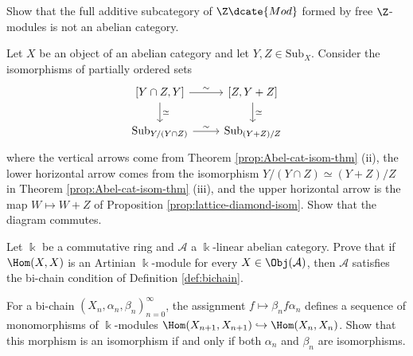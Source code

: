 \begin{Exercises}
	\item Show that the full additive subcategory of $\Z\dcate{Mod}$ formed by
	free $\Z$-modules is not an abelian category.

	\item Let $X$ be an object of an abelian category and let
	$Y,Z\in\mathrm{Sub}_X$. Consider the isomorphisms of partially ordered sets
	\[\begin{tikzcd}
		\left[Y \cap Z, Y \right] \arrow[d, "\simeq"] \arrow[r, "\sim"] & \left[ Z, Y+Z \right] \arrow[d, "\simeq"] \\
		\mathrm{Sub}_{Y/(Y \cap Z)} \arrow[r, "\sim"] & \mathrm{Sub}_{(Y+Z)/Z}
	\end{tikzcd}\]
	where the vertical arrows come from Theorem
	\ref{prop:Abel-cat-isom-thm} (ii), the lower horizontal arrow comes from
	the isomorphism $Y/(Y\cap Z)\simeq(Y+Z)/Z$ in Theorem
	\ref{prop:Abel-cat-isom-thm} (iii), and the upper horizontal arrow is the
	map $W\mapsto W+Z$ of Proposition \ref{prop:lattice-diamond-isom}. Show
	that the diagram commutes.

	\item Let $\Bbbk$ be a commutative ring and $\mathcal{A}$ a
	$\Bbbk$-linear abelian category. Prove that if $\Hom(X,X)$ is an Artinian
	$\Bbbk$-module for every $X\in\Obj(\mathcal{A})$, then $\mathcal{A}$
	satisfies the bi-chain condition of Definition \ref{def:bichain}.
	\begin{hint}
		For a bi-chain $(X_n,\alpha_n,\beta_n)_{n=0}^\infty$, the assignment
		$f\mapsto\beta_n f\alpha_n$ defines a sequence of monomorphisms of
		$\Bbbk$-modules
		$\Hom(X_{n+1},X_{n+1})\hookrightarrow\Hom(X_n,X_n)$. Show that this
		morphism is an isomorphism if and only if both $\alpha_n$ and $\beta_n$
		are isomorphisms.
	\end{hint}


\end{Exercises}
